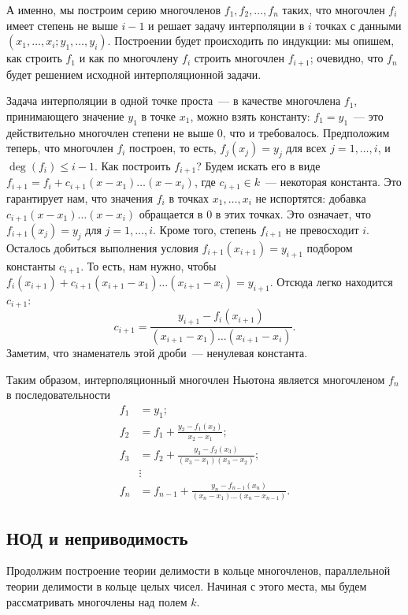 А именно, мы построим серию многочленов $f_1,f_2,\dots,f_n$ таких, что
многочлен $f_i$ имеет степень не выше $i-1$ и решает задачу
интерполяции в $i$ точках с данными
$(x_1,\dots,x_i;y_1,\dots,y_i)$. Построении будет происходить по
индукции: мы опишем, как строить $f_1$ и как по многочлену $f_i$
строить многочлен $f_{i+1}$; очевидно, что $f_n$ будет решением
исходной интерполяционной задачи.

Задача интерполяции в одной точке проста~--- в качестве многочлена
$f_1$, принимающего значение $y_1$ в точке $x_1$, можно взять
константу: $f_1=y_1$~--- это действительно многочлен степени не выше
$0$, что и требовалось.
Предположим теперь, что многочлен $f_i$ построен, то есть,
$f_j(x_j)=y_j$ для всех $j=1,\dots,i$, и $\deg(f_i)\leq i-1$. Как
построить $f_{i+1}$? Будем искать его в виде
$f_{i+1}=f_i+c_{i+1}(x-x_1)\dots(x-x_i)$, где $c_{i+1}\in k$~--- некоторая
константа. Это гарантирует нам, что значения
$f_i$ в точках $x_1,\dots,x_i$ не испортятся: добавка $c_{i+1}(x-x_1)\dots
(x-x_i)$ обращается в $0$ в этих точках. Это означает, что
$f_{i+1}(x_j)=y_j$ для $j=1,\dots,i$. Кроме того, степень $f_{i+1}$ не
превосходит $i$. Осталось добиться выполнения условия
$f_{i+1}(x_{i+1})=y_{i+1}$ подбором константы $c_{i+1}$.
То есть, нам нужно, чтобы
$f_i(x_{i+1})+c_{i+1}(x_{i+1}-x_1)\dots(x_{i+1}-x_i)=y_{i+1}$. Отсюда
легко находится $c_{i+1}$:
$$
c_{i+1}=\frac{y_{i+1}-f_i(x_{i+1})}{(x_{i+1}-x_1)\dots(x_{i+1}-x_i)}.
$$
Заметим, что знаменатель этой дроби~--- ненулевая константа.

Таким образом, интерполяционный многочлен Ньютона является многочленом
$f_n$ в последовательности
\begin{align*}
f_1&=y_1;\\
f_2&=f_1+\frac{y_2-f_1(x_2)}{x_2-x_1};\\
f_3&=f_2+\frac{y_3-f_2(x_3)}{(x_3-x_1)(x_3-x_2)};\\
&\vdots\\
f_n&=f_{n-1}+\frac{y_n-f_{n-1}(x_n)}{(x_n-x_1)\dots(x_n-x_{n-1})}.
\end{align*}

\subsection{НОД и неприводимость}\label{ssect:polynomial_gcd}


Продолжим построение теории делимости в кольце многочленов,
параллельной теории делимости в кольце целых чисел. Начиная с этого
места, мы будем рассматривать многочлены над полем $k$.

